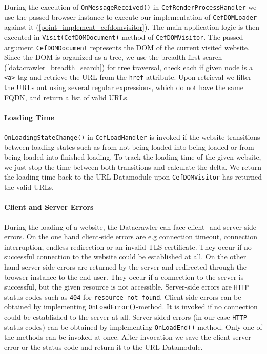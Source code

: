During the execution of \texttt{OnMessageReceived()} in \texttt{CefRenderProcessHandler} we use the passed browser instance to execute our implementation of \texttt{CefDOMLoader} against it (\ref{point_implement_cefdomvisitor}). The main application logic is then executed in \texttt{Visit(CefDOMDocument)}-method of \texttt{CefDOMVisitor}. The passed argument \texttt{CefDOMDocument} represents the DOM of the current visited website. Since the DOM is organized as a tree, we use the breadth-first search (\ref{datacrawler_breadth_search}) for tree traversal, check each if given node is a \texttt{<a>}-tag and retrieve the URL from the \texttt{href}-attribute. Upon retrieval we filter the URLs out using several regular expressions, which do not have the same FQDN, and return a list of valid URLs.

\paragraph{Loading Time}
\texttt{OnLoadingStateChange()} in \texttt{CefLoadHandler} is invoked if the website transitions between loading states such as from not being loaded into being loaded or from being loaded into finished loading. To track the loading time of the given website, we just stop the time between both transitions and calculate the delta. We return the loading time back to the URL-Datamodule upon \texttt{CefDOMVisitor} has returned the valid URLs.

\paragraph{Client and Server Errors}
During the loading of a website, the Datacrawler can face client- and server-side errors. On the one hand client-side errors are e.g connection timeout, connection interruption, endless redirection or an invalid TLS certificate. They occur if no successful connection to the website could be established at all. On the other hand server-side errors are returned by the server and redirected through the browser instance to the end-user. They occur if a connection to the server is successful, but the given resource is not accessible. Server-side errors are \texttt{HTTP} status codes such as \texttt{404} for \texttt{resource not found}. Client-side errors can be obtained by implementing \texttt{OnLoadError()}-method. It is invoked if no connection could be established to the server at all. Server-sided errors (in our case \texttt{HTTP}-status codes) can be obtained by implementing \texttt{OnLoadEnd()}-method. Only one of the methods can be invoked at once. After invocation we save the client-server error or the status code and return it to the URL-Datamodule.

